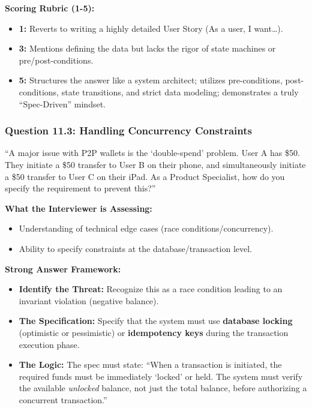 \documentclass[
  11pt,
  openany,
  oneside]{book}
\providecommand{\tightlist}{%
  \setlength{\itemsep}{0pt}\setlength{\parskip}{0pt}}
\begin{document}
\textbf{Scoring Rubric (1-5):}

\begin{itemize}
\tightlist
\item
  \textbf{1:} Reverts to writing a highly detailed User Story (As a
  user, I want\ldots).
\item
  \textbf{3:} Mentions defining the data but lacks the rigor of state
  machines or pre/post-conditions.
\item
  \textbf{5:} Structures the answer like a system architect; utilizes
  pre-conditions, post-conditions, state transitions, and strict data
  modeling; demonstrates a truly ``Spec-Driven'' mindset.
\end{itemize}

\subsubsection{Question 11.3: Handling Concurrency
Constraints}\label{question-11.3-handling-concurrency-constraints}

``A major issue with P2P wallets is the `double-spend' problem. User A
has \$50. They initiate a \$50 transfer to User B on their phone, and
simultaneously initiate a \$50 transfer to User C on their iPad. As a
Product Specialist, how do you specify the requirement to prevent
this?''

\textbf{What the Interviewer is Assessing:}

\begin{itemize}
\tightlist
\item
  Understanding of technical edge cases (race conditions/concurrency).
\item
  Ability to specify constraints at the database/transaction level.
\end{itemize}

\textbf{Strong Answer Framework:}

\begin{itemize}
\tightlist
\item
  \textbf{Identify the Threat:} Recognize this as a race condition
  leading to an invariant violation (negative balance).
\item
  \textbf{The Specification:} Specify that the system must use
  \textbf{database locking} (optimistic or pessimistic) or
  \textbf{idempotency keys} during the transaction execution phase.
\item
  \textbf{The Logic:} The spec must state: ``When a transaction is
  initiated, the required funds must be immediately `locked' or held.
  The system must verify the available \emph{unlocked} balance, not just
  the total balance, before authorizing a concurrent transaction.''
\end{itemize}
\end{document}
